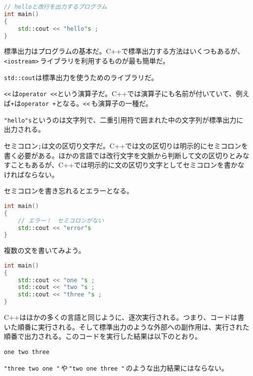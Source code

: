 
\begin{lstlisting}[language={C++}]
// helloと改行を出力するプログラム
int main()
{
    std::cout << "hello"s ;
}
\end{lstlisting}

標準出力はプログラムの基本だ。C++で標準出力する方法はいくつもあるが、\texttt{<iostream>}\,ライブラリを利用するものが最も簡単だ。

\texttt{std::cout}は標準出力を使うためのライブラリだ。

\texttt{{<}{<}}\,は\texttt{operator {<}{<}}という演算子だ。C++では演算子にも名前が付いていて、例えば\texttt{+}は\texttt{operator +}となる。\texttt{{<}{<}}\,も演算子の一種だ。

\texttt{"hello"s}というのは文字列で、二重引用符で囲まれた中の文字列が標準出力に出力される。

セミコロン\texttt{;}は文の区切り文字だ。C++では文の区切りは明示的にセミコロンを書く必要がある。ほかの言語では改行文字を文脈から判断して文の区切りとみなすこともあるが、C++では明示的に文の区切り文字としてセミコロンを書かなければならない。

セミコロンを書き忘れるとエラーとなる。

\begin{lstlisting}[language={C++}]
int main()
{
    // エラー！　セミコロンがない
    std::cout << "error"s
}
\end{lstlisting}

複数の文を書いてみよう。

\begin{lstlisting}[language={C++}]
int main()
{
    std::cout << "one "s ;
    std::cout << "two "s ;
    std::cout << "three "s ;
}
\end{lstlisting}

C++はほかの多くの言語と同じように、逐次実行される。つまり、コードは書いた順番に実行される。そして標準出力のような外部への副作用は、実行された順番で出力される。このコードを実行した結果は以下のとおり。

\begin{lstlisting}[style=terminal]
one two three 
\end{lstlisting}

\texttt{"three two one "}\,や\,\texttt{"two one three "}\,のような出力結果にはならない。

